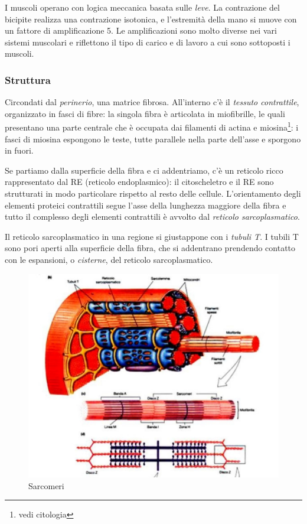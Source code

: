 \documentclass[a4paper,12pt]{article}
\begin{document}
I muscoli operano con logica meccanica basata sulle \emph{leve}. La contrazione del bicipite realizza una contrazione isotonica, e l'estremità della mano si muove con un fattore di amplificazione 5. Le amplificazioni sono molto diverse nei vari sistemi muscolari e riflettono il tipo di carico e di lavoro a cui sono sottoposti i muscoli.

\subsubsection{Struttura}
Circondati dal \emph{perinerio}, una matrice fibrosa. All'interno c'è il \emph{tessuto contrattile}, organizzato in fasci di fibre: la singola fibra è articolata in miofibrille, le quali presentano una parte centrale che è occupata dai filamenti di actina e miosina\footnote{vedi citologia}: i fasci di miosina espongono le teste, tutte parallele nella parte dell'asse e sporgono in fuori. 

Se partiamo dalla superficie della fibra e ci addentriamo, c'è un reticolo ricco rappresentato dal RE (reticolo endoplasmico): il citoscheletro e il RE sono strutturati in modo particolare rispetto al resto delle cellule. L'orientamento degli elementi proteici contrattili segue l'asse della lunghezza maggiore della fibra e tutto il complesso degli elementi contrattili è avvolto dal \emph{reticolo sarcoplasmatico}.

Il reticolo sarcoplasmatico in una regione si giustappone con i \emph{tubuli T}. I tubili T sono pori aperti alla superficie della fibra, che si addentrano prendendo contatto con le espansioni, o \emph{cisterne}, del reticolo sarcoplasmatico.
\begin{figure}[H]
\centering
\includegraphics[scale=0.4]{immagine/T.jpg}
\caption{Sarcomeri}
\end{figure}
\end{document}
